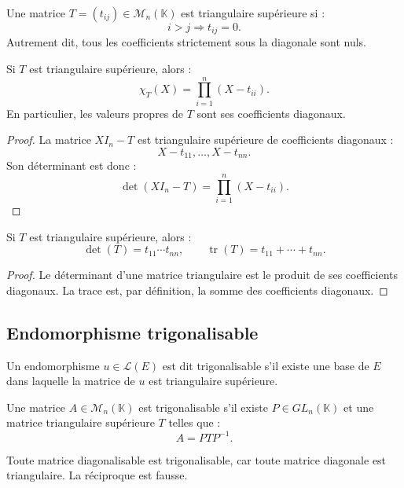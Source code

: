 \documentclass[11pt,a4paper]{article}
\newcommand{\K}{\mathbb K}
\newcommand{\M}{\mathcal M}
\newcommand{\Lcal}{\mathcal L}
\newcommand{\tr}{\operatorname{tr}}
\begin{document}
\begin{definitionbox}
Une matrice \(T=(t_{ij})\in\M_n(\K)\) est triangulaire supérieure si :
\[
i>j\Longrightarrow t_{ij}=0.
\]
Autrement dit, tous les coefficients strictement sous la diagonale sont nuls.
\end{definitionbox}

\begin{theorembox}
Si \(T\) est triangulaire supérieure, alors :
\[
\chi_T(X)=\prod_{i=1}^n(X-t_{ii}).
\]
En particulier, les valeurs propres de \(T\) sont ses coefficients diagonaux.
\end{theorembox}

\begin{proof}
La matrice \(XI_n-T\) est triangulaire supérieure de coefficients diagonaux :
\[
X-t_{11},\dots,X-t_{nn}.
\]
Son déterminant est donc :
\[
\det(XI_n-T)=\prod_{i=1}^n(X-t_{ii}).
\]
\end{proof}

\begin{theorembox}
Si \(T\) est triangulaire supérieure, alors :
\[
\det(T)=t_{11}\cdots t_{nn},
\qquad
\tr(T)=t_{11}+\cdots+t_{nn}.
\]
\end{theorembox}

\begin{proof}
Le déterminant d'une matrice triangulaire est le produit de ses coefficients diagonaux.  
La trace est, par définition, la somme des coefficients diagonaux.
\end{proof}

\subsection{Endomorphisme trigonalisable}

\begin{definitionbox}
Un endomorphisme \(u\in\Lcal(E)\) est dit trigonalisable s'il existe une base de \(E\) dans laquelle la matrice de \(u\) est triangulaire supérieure.
\end{definitionbox}

\begin{definitionbox}
Une matrice \(A\in\M_n(\K)\) est trigonalisable s'il existe \(P\in GL_n(\K)\) et une matrice triangulaire supérieure \(T\) telles que :
\[
A=PTP^{-1}.
\]
\end{definitionbox}

\begin{retenirbox}
Toute matrice diagonalisable est trigonalisable, car toute matrice diagonale est triangulaire.  
La réciproque est fausse.
\end{retenirbox}
\end{document}
